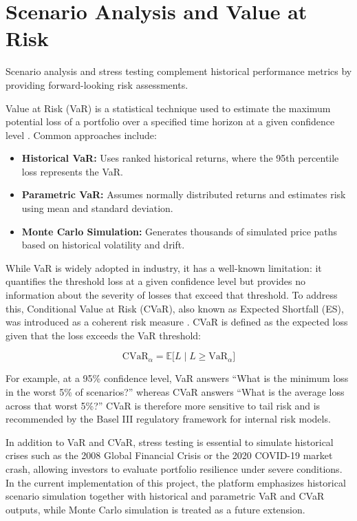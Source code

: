 \section{Scenario Analysis and Value at Risk}

Scenario analysis and stress testing complement historical performance metrics by providing forward-looking risk assessments.

Value at Risk (VaR) is a statistical technique used to estimate the maximum potential loss of a portfolio over a specified time horizon at a given confidence level \cite{jorion2006}. Common approaches include:

\begin{itemize}
    \item \textbf{Historical VaR:} Uses ranked historical returns, where the 95th percentile loss represents the VaR.
    \item \textbf{Parametric VaR:} Assumes normally distributed returns and estimates risk using mean and standard deviation.
    \item \textbf{Monte Carlo Simulation:} Generates thousands of simulated price paths based on historical volatility and drift.
\end{itemize}

While VaR is widely adopted in industry, it has a well-known limitation: it quantifies the threshold loss at a given confidence level but provides no information about the severity of losses that exceed that threshold. To address this, Conditional Value at Risk (CVaR), also known as Expected Shortfall (ES), was introduced as a coherent risk measure \cite{rockafellar2000}. CVaR is defined as the expected loss given that the loss exceeds the VaR threshold:

\[
    \text{CVaR}_\alpha = \mathbb{E}\bigl[L \mid L \geq \text{VaR}_\alpha\bigr]
\]

For example, at a 95\% confidence level, VaR answers ``What is the minimum loss in the worst 5\% of scenarios?'' whereas CVaR answers ``What is the average loss across that worst 5\%?'' CVaR is therefore more sensitive to tail risk and is recommended by the Basel III regulatory framework for internal risk models.

In addition to VaR and CVaR, stress testing is essential to simulate historical crises such as the 2008 Global Financial Crisis or the 2020 COVID-19 market crash, allowing investors to evaluate portfolio resilience under severe conditions. In the current implementation of this project, the platform emphasizes historical scenario simulation together with historical and parametric VaR and CVaR outputs, while Monte Carlo simulation is treated as a future extension.

